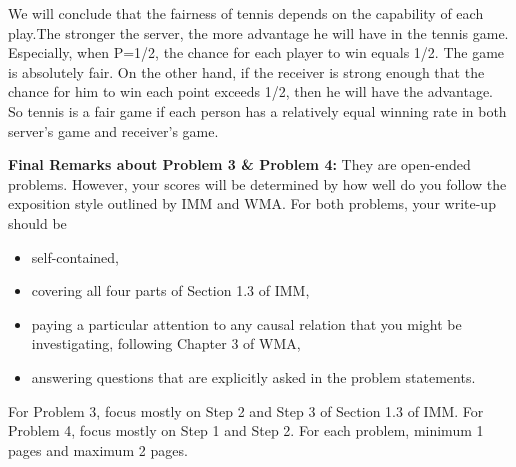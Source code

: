 \documentclass[12pt]{article}
\begin{document}
\noindent\textbf{}
We will conclude that the fairness of tennis depends on the capability of each play.The stronger the server, the more advantage he will have in the tennis game. Especially, when P=1/2, the chance for each player to win equals 1/2. The game is absolutely fair. On the other hand, if the receiver is strong enough that the chance for him to win each point exceeds 1/2, then he will have the advantage. So tennis is a fair game if each person has a relatively equal winning rate in both server's game and receiver's game.


\vskip0.25in
\noindent\textbf{Final Remarks about Problem 3 \& Problem 4:} 
They are open-ended problems.  However, your scores will be determined
by how well do you follow the exposition style outlined by IMM and
WMA.  For both problems, your write-up should be 
\begin{itemize}
\item self-contained,
\item covering all four parts of Section 1.3 of IMM,
\item paying a particular attention to any causal relation that you
  might be investigating, following Chapter 3 of WMA,
\item answering questions that are explicitly asked in the problem statements.
\end{itemize}
For Problem 3, focus mostly on Step 2 and Step 3 of Section
1.3 of IMM.  For Problem 4, focus mostly on Step 1 and Step
2.  For each problem, minimum 1 pages and maximum 2 pages.
\end{document}
